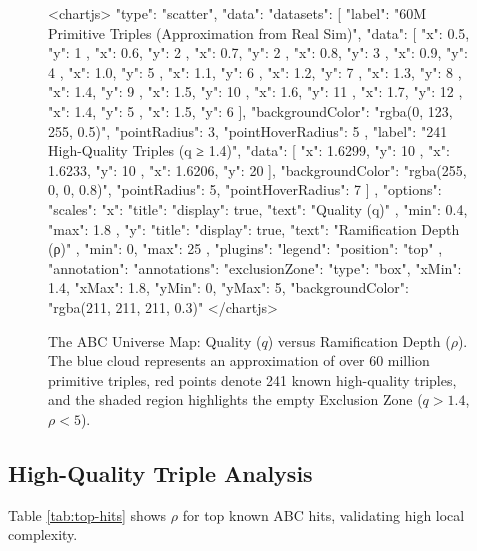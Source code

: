 \documentclass[11pt,a4paper]{article}
\begin{document}
\begin{figure}[h!]
    \centering
    <chartjs>
    {
      "type": "scatter",
      "data": {
        "datasets": [
          {
            "label": "60M Primitive Triples (Approximation from Real Sim)",
            "data": [
              { "x": 0.5, "y": 1 }, { "x": 0.6, "y": 2 }, { "x": 0.7, "y": 2 },
              { "x": 0.8, "y": 3 }, { "x": 0.9, "y": 4 }, { "x": 1.0, "y": 5 },
              { "x": 1.1, "y": 6 }, { "x": 1.2, "y": 7 }, { "x": 1.3, "y": 8 },
              { "x": 1.4, "y": 9 }, { "x": 1.5, "y": 10 }, { "x": 1.6, "y": 11 },
              { "x": 1.7, "y": 12 }, { "x": 1.4, "y": 5 }, { "x": 1.5, "y": 6 }
            ],
            "backgroundColor": "rgba(0, 123, 255, 0.5)",
            "pointRadius": 3,
            "pointHoverRadius": 5
          },
          {
            "label": "241 High-Quality Triples (q ≥ 1.4)",
            "data": [
              { "x": 1.6299, "y": 10 }, { "x": 1.6233, "y": 10 },
              { "x": 1.6206, "y": 20 }
            ],
            "backgroundColor": "rgba(255, 0, 0, 0.8)",
            "pointRadius": 5,
            "pointHoverRadius": 7
          }
        ]
      },
      "options": {
        "scales": {
          "x": {
            "title": { "display": true, "text": "Quality (q)" },
            "min": 0.4, "max": 1.8
          },
          "y": {
            "title": { "display": true, "text": "Ramification Depth (ρ)" },
            "min": 0, "max": 25
          }
        },
        "plugins": {
          "legend": { "position": "top" },
          "annotation": {
            "annotations": {
              "exclusionZone": {
                "type": "box",
                "xMin": 1.4, "xMax": 1.8,
                "yMin": 0, "yMax": 5,
                "backgroundColor": "rgba(211, 211, 211, 0.3)"
              }
            }
          }
        }
      }
    }
    </chartjs>
    \caption{The ABC Universe Map: Quality (\(q\)) versus Ramification Depth (\(\rho\)). The blue cloud represents an approximation of over 60 million primitive triples, red points denote 241 known high-quality triples, and the shaded region highlights the empty Exclusion Zone (\(q > 1.4\), \(\rho < 5\)).}
    \label{fig:abc_universe}
\end{figure}

\subsection{High-Quality Triple Analysis}
Table \ref{tab:top-hits} shows \(\rho\) for top known ABC hits, validating high local complexity.
\end{document}
